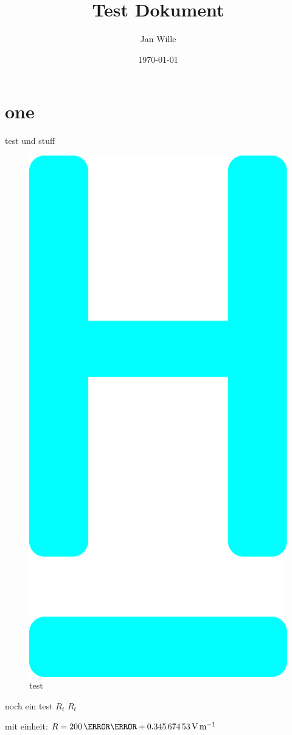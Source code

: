 \documentclass[11pt,a4paper,twoside]{HsH-report}
\title{Test Dokument}
\author{Jan Wille}
\date{\today}
\begin{document}
\maketitle

\declarationAuthorship

\begin{abstract}
    \lipsum[5-8]
\end{abstract}

\tableofcontents

\chapter{one}
    \label{chap: one}
    {\color{red}test} und stuff
    \begin{figure}
        \centering
        \includegraphics[width=.15\textwidth]{logo-test}
        \caption{test}
    \end{figure}

    noch ein test \normalsubscripts$R_t$ \upsubscripts$R_t$

    mit einheit: $R=200\,\milli\ohm+ \SI{0.34567453}{\volt\per\metre}$

\listoffigures
\end{document}
